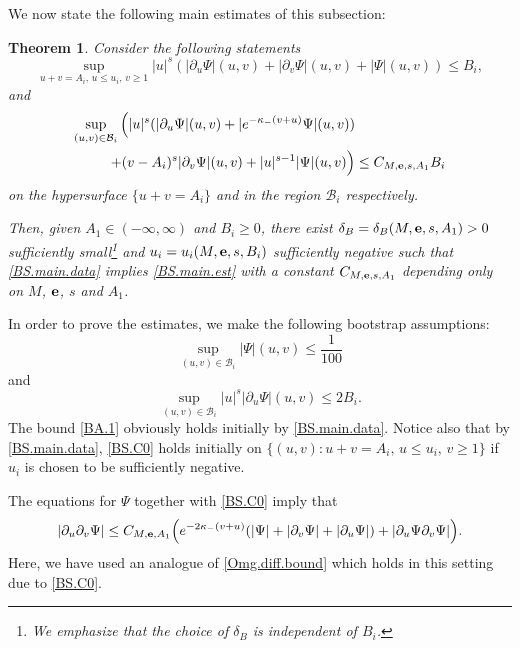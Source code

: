 \documentclass[10pt, reqno]{amsart}
\newtheorem{theorem}{Theorem}[section]
\theoremstyle{definition}
\theoremstyle{remark}
\numberwithin{equation}{section}
\newcommand{\rd}{\partial}
\newcommand{\bb}{\Big}
\newcommand{\0}{\emptyset}
\newcommand{\f}{\frac}
\newcommand{\de}{\delta}
\begin{document}
We now state the following main estimates of this subsection:
\begin{theorem}\label{BS.main}
Consider the following statements
\begin{equation}\label{BS.main.data}
\sup_{u+v=A_i,\, u\leq u_i,\, v\geq 1}|u|^s (|\rd_u\Psi|(u,v)+|\rd_v\Psi|(u,v)+|\Psi|(u,v))\leq B_i,
\end{equation}
and
\begin{equation}\label{BS.main.est}
\begin{split}
\sup_{(u,v)\in\mathcal B_i} \bb( |u|^s(|\rd_u\Psi|(u,v)+|e^{-\kappa_- (v+u)}\Psi|(u,v)) &\\
+(v-A_i)^s|\rd_v\Psi|(u,v)+|u|^{s-1}|\Psi|(u,v) \bb) &\leq C_{M, {\bf e},s,A_1} B_i
\end{split}
\end{equation}
on the hypersurface $\{u+v=A_i\}$ and in the region $\mathcal B_i$ respectively.

Then, given $A_1\in (-\infty,\infty)$ and $B_i\geq 0$, there exist $\de_B=\de_B(M,{\bf e},s,A_1)>0$ sufficiently small\footnote{We emphasize that the choice of $\de_B$ is independent of $B_i$.} and $u_i=u_i(M,{\bf e},s,B_i)$ sufficiently negative such that \eqref{BS.main.data} implies \eqref{BS.main.est} with a constant $C_{M,{\bf e},s,A_1}$ depending only on $M$, ${\bf e}$, $s$ and $A_1$.
\end{theorem}
In order to prove the estimates, we make the following bootstrap assumptions:
\begin{equation}\label{BS.C0}
\sup_{(u,v)\in \mathcal B_i}|\Psi|(u,v)\leq \f{1}{100}
\end{equation}
and
\begin{equation}\label{BA.1}
\sup_{(u,v)\in \mathcal B_i}|u|^s|\rd_u\Psi|(u,v)\leq 2B_i.
\end{equation}
The bound \eqref{BA.1} obviously holds initially by \eqref{BS.main.data}. Notice also that by \eqref{BS.main.data}, \eqref{BS.C0} holds initially on $\{(u,v):u+v=A_i,\,u\leq u_i,\,v\geq 1\}$ if $u_i$ is chosen to be sufficiently negative.

The equations for $\Psi$ together with \eqref{BS.C0} imply that
\begin{equation}\label{BS.eqn}
|\rd_u\rd_v\Psi|\leq C_{M,{\bf e},A_1} \bb( e^{-2\kappa_-(v+u)} (|\Psi|+|\rd_v\Psi|+|\rd_u\Psi|)+|\rd_u\Psi\rd_v\Psi| \bb).
\end{equation}
Here, we have used an analogue of \eqref{Omg.diff.bound} which holds in this setting due to \eqref{BS.C0}.
\end{document}
